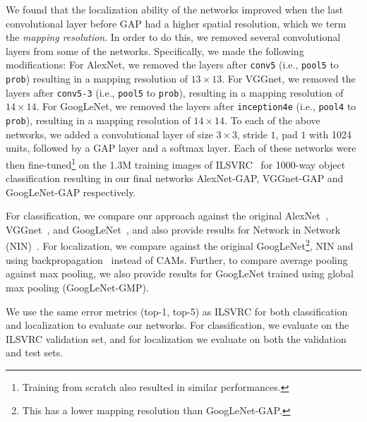 \documentclass[10pt,twocolumn,letterpaper]{article}
\begin{document}
We found that the localization ability of the networks improved when the last convolutional layer before GAP had a higher spatial resolution, which we term the \textit{mapping resolution}. In order to do this, we removed several convolutional layers from some of the networks. Specifically, we made the following modifications: For AlexNet, we removed the layers after \texttt{conv5}
(i.e., \texttt{pool5} to \texttt{prob}) resulting in a mapping resolution of $13 \times 13$. For VGGnet, we removed the layers after \texttt{conv5-3} (i.e., \texttt{pool5} to \texttt{prob}), resulting in a mapping resolution of $14 \times 14$. For GoogLeNet, we removed the layers after \texttt{inception4e} (i.e., \texttt{pool4} to \texttt{prob}), resulting in a mapping resolution of $14 \times 14$. To each of the above networks, we added a convolutional layer of size $3\times3$, stride $1$, pad $1$ with 1024 units, followed by a GAP layer and a softmax layer. Each of these networks were then fine-tuned\footnote{Training from scratch also resulted in similar performances.} on the 1.3M training images of ILSVRC~\cite{ILSVRCijcv15} for 1000-way object classification resulting in our final networks AlexNet-GAP, VGGnet-GAP and GoogLeNet-GAP respectively.

For classification, we compare our approach against the original AlexNet~\cite{krizhevsky2012imagenet}, VGGnet~\cite{simonyan2014very}, and GoogLeNet~\cite{szegedy2014going}, and also provide results for Network in Network (NIN)~\cite{lin2013network}. For localization, we compare against the original GoogLeNet\footnote{This has a lower mapping resolution than GoogLeNet-GAP.}, NIN and using backpropagation~\cite{simonyan2013deep} instead of CAMs. Further, to compare average pooling against max pooling, we also provide results for GoogLeNet trained using global max pooling (GoogLeNet-GMP).

We use the same error metrics (top-1, top-5) as ILSVRC for both classification and localization to evaluate our networks. For classification, we evaluate on the ILSVRC validation set, and for localization we evaluate on both the validation and test sets. 
\end{document}
